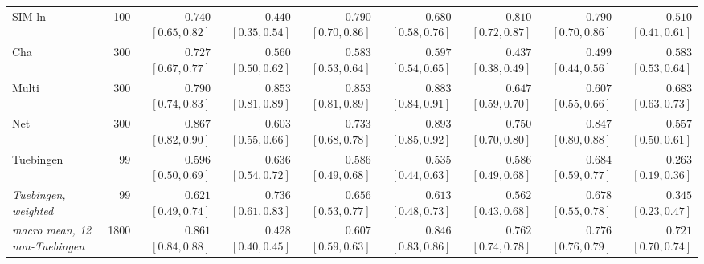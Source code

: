 \begin{table}[!t]
{\begin{tabular}{l r rrrr rr r}
  SIM-ln & 100 & $0.740$ {\tiny$[0.65,0.82]$} & $0.440$ {\tiny$[0.35,0.54]$} & $0.790$ {\tiny$[0.70,0.86]$} & $0.680$ {\tiny$[0.58,0.76]$} & $0.810$ {\tiny$[0.72,0.87]$} & $0.790$ {\tiny$[0.70,0.86]$} & $0.510$ {\tiny$[0.41,0.61]$}\\
  Cha & 300 & $0.727$ {\tiny$[0.67,0.77]$} & $0.560$ {\tiny$[0.50,0.62]$} & $0.583$ {\tiny$[0.53,0.64]$} & $0.597$ {\tiny$[0.54,0.65]$} & $0.437$ {\tiny$[0.38,0.49]$} & $0.499$ {\tiny$[0.44,0.56]$} & $0.583$ {\tiny$[0.53,0.64]$}\\
  Multi & 300 & $0.790$ {\tiny$[0.74,0.83]$} & $0.853$ {\tiny$[0.81,0.89]$} & $0.853$ {\tiny$[0.81,0.89]$} & $0.883$ {\tiny$[0.84,0.91]$} & $0.647$ {\tiny$[0.59,0.70]$} & $0.607$ {\tiny$[0.55,0.66]$} & $0.683$ {\tiny$[0.63,0.73]$}\\
  Net & 300 & $0.867$ {\tiny$[0.82,0.90]$} & $0.603$ {\tiny$[0.55,0.66]$} & $0.733$ {\tiny$[0.68,0.78]$} & $0.893$ {\tiny$[0.85,0.92]$} & $0.750$ {\tiny$[0.70,0.80]$} & $0.847$ {\tiny$[0.80,0.88]$} & $0.557$ {\tiny$[0.50,0.61]$}\\
  Tuebingen & 99 & $0.596$ {\tiny$[0.50,0.69]$} & $0.636$ {\tiny$[0.54,0.72]$} & $0.586$ {\tiny$[0.49,0.68]$} & $0.535$ {\tiny$[0.44,0.63]$} & $0.586$ {\tiny$[0.49,0.68]$} & $0.684$ {\tiny$[0.59,0.77]$} & $0.263$ {\tiny$[0.19,0.36]$}\\
  \midrule
  \emph{Tuebingen, weighted} & 99 & $0.621$ {\tiny$[0.49,0.74]$} & $0.736$ {\tiny$[0.61,0.83]$} & $0.656$ {\tiny$[0.53,0.77]$} & $0.613$ {\tiny$[0.48,0.73]$} & $0.562$ {\tiny$[0.43,0.68]$} & $0.678$ {\tiny$[0.55,0.78]$} & $0.345$ {\tiny$[0.23,0.47]$}\\
  \midrule
  \emph{macro mean, 12 non-Tuebingen} & 1800 & $0.861$ {\tiny$[0.84,0.88]$} & $0.428$ {\tiny$[0.40,0.45]$} & $0.607$ {\tiny$[0.59,0.63]$} & $0.846$ {\tiny$[0.83,0.86]$} & $0.762$ {\tiny$[0.74,0.78]$} & $0.776$ {\tiny$[0.76,0.79]$} & $0.721$ {\tiny$[0.70,0.74]$}\\
  \bottomrule
  \end{tabular}}
\vspace{3pt}
\end{table}
